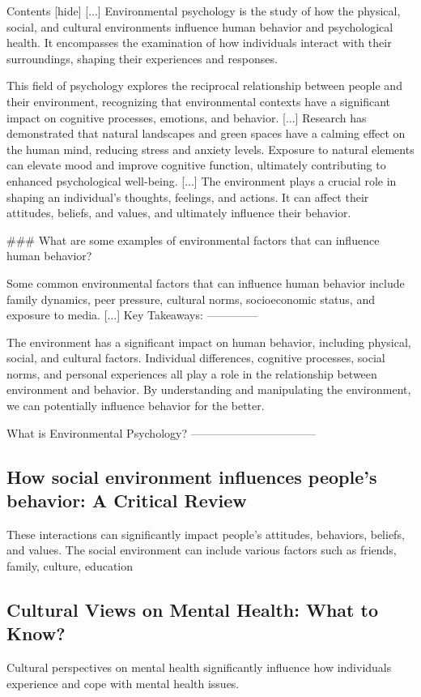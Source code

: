 \documentclass[12pt]{article}
\begin{document}
Contents [hide] [...] Environmental psychology is the study of how the physical, social, and cultural environments influence human behavior and psychological health. It encompasses the examination of how individuals interact with their surroundings, shaping their experiences and responses.

This field of psychology explores the reciprocal relationship between people and their environment, recognizing that environmental contexts have a significant impact on cognitive processes, emotions, and behavior. [...] Research has demonstrated that natural landscapes and green spaces have a calming effect on the human mind, reducing stress and anxiety levels. Exposure to natural elements can elevate mood and improve cognitive function, ultimately contributing to enhanced psychological well-being. [...] The environment plays a crucial role in shaping an individual’s thoughts, feelings, and actions. It can affect their attitudes, beliefs, and values, and ultimately influence their behavior.

\#\#\# What are some examples of environmental factors that can influence human behavior?

Some common environmental factors that can influence human behavior include family dynamics, peer pressure, cultural norms, socioeconomic status, and exposure to media. [...] Key Takeaways:
--------------

    The environment has a significant impact on human behavior, including physical, social, and cultural factors. 
    Individual differences, cognitive processes, social norms, and personal experiences all play a role in the relationship between environment and behavior. 
    By understanding and manipulating the environment, we can potentially influence behavior for the better.

What is Environmental Psychology?
---------------------------------\subsection{How social environment influences people's behavior: A Critical Review}
These interactions can significantly impact people's attitudes, behaviors, beliefs, and values. The social environment can include various factors such as friends, family, culture, education\subsection{Cultural Views on Mental Health: What to Know?}
Cultural perspectives on mental health significantly influence how individuals experience and cope with mental health issues.
\end{document}
